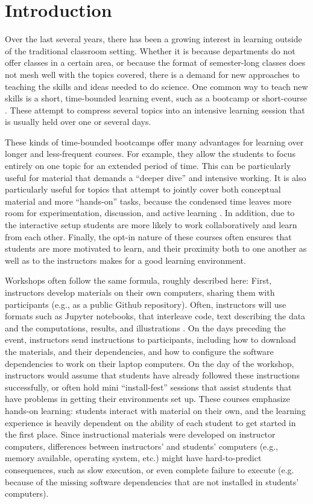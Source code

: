 \section{Introduction}

Over the last several years, there has been a growing interest in learning
outside of the traditional classroom setting. Whether it is because departments
do not offer classes in a certain area, or because the format of semester-long
classes does not mesh well with the topics covered, there is a demand for new
approaches to teaching the skills and ideas needed to do science. One common way
to teach new skills is a short, time-bounded learning event, such as a bootcamp
or short-course \cite{wilson2016software}. These attempt to compress several
topics into an intensive learning session that is usually held over one or
several days.

These kinds of time-bounded bootcamps offer many advantages for learning over
longer and less-frequent courses. For example, they allow the students to focus
entirely on one topic for an extended period of time. This can be particularly
useful for material that demands a ``deeper dive'' and intensive working. It is
also particularly useful for topics that attempt to jointly cover both
conceptual material and more ``hands-on'' tasks, because the condensed time
leaves more room for experimentation, discussion, and active learning
\citep{Bransford2000-lu, Papert1980-fh}. In addition, due to the interactive
setup students are more likely to work collaboratively and learn from each
other. Finally, the opt-in nature of these
courses often ensures that students are more motivated to learn, and their
proximity both to one another as well as to the instructors makes for a good
learning environment.

Workshops often follow the same formula, roughly described here: First,
instructors develop materials on their own computers, sharing them with
participants (e.g., as a public Github repository). Often, instructors will use
formats such as Jupyter notebooks, that interleave code, text describing the
data and the computations, results, and illustrations
\cite{kluyver2016jupyter}. On the days preceding the event, instructors send
instructions to participants, including how to download the materials, and their
dependencies, and how to configure the software dependencies to work on their
laptop computers. On the day of the workshop, instructors would assume that
students have already followed these instructions successfully, or often hold
mini ``install-fest'' sessions that assist students that have problems in
getting their environments set up. These courses emphasize hands-on learning:
students interact with material on their own, and the learning experience is
heavily dependent on the ability of each student to get started in the first
place. Since instructional materials were developed on instructor computers,
differences between instructors' and students' computers (e.g., memory
available, operating system, etc.) might have hard-to-predict consequences, such
as slow execution, or even complete failure to execute (e.g. because of the missing software
dependencies that are not installed in students' computers).

